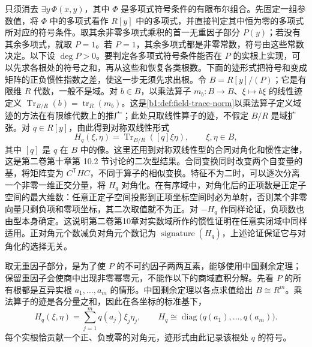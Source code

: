 \begin{proofsketch}
	只须消去 \(\exists y\,\Phi(x,y)\)，其中 \(\Phi\) 是多项式符号条件的有限布尔组合。先固定一组参数值，将 \(\Phi\) 中的多项式看作 \(R[y]\) 中的多项式，并直接判定其中恒为零的多项式所对应的符号条件。取其余非零多项式乘积的首一无重因子部分 \(P(y)\)；若没有其余多项式，就取 \(P=1\)。若 \(P=1\)，其余多项式都是非零常数，符号由这些常数决定。以下设 \(\deg P>0\)。要判定各多项式符号条件能否在 \(P\) 的实根上实现，可以先求各根处的符号之和，再从这些和恢复各类根数。下面的迹形式把符号和变成矩阵的正负惯性指数之差，使这一步无须先求出根。令 \(B=R[y]/(P)\)；它是有限维 \(R\) 代数，一般不是域。对 \(b\in B\)，以乘法算子 \(m_b:B\to B\)、\(\xi\mapsto b\xi\) 的线性迹定义 \(\operatorname{Tr}_{B/R}(b)=\operatorname{tr}_R(m_b)\)。这是\cref{b1:def:field-trace-norm}以乘法算子定义域迹的方法在有限维代数上的推广；此处只取线性算子的迹，不假定 \(B/R\) 是域扩张。对 \(q\in R[y]\)，由此得到对称双线性形式
	\[
		H_q(\xi,\eta)=\operatorname{Tr}_{B/R}([q]\xi\eta),\qquad \xi,\eta\in B,
	\]
	其中 \([q]\) 是 \(q\) 在 \(B\) 中的像。这里还用到对称双线性型的合同对角化和惯性定律，这是第二卷第十章第 10.2 节讨论的二次型结果。合同变换同时改变两个自变量的基，将矩阵变为 \(C^{\mathsf T}HC\)，不同于算子的相似变换。特征不为二时，可以逐次分离一个非零一维正交分量，将 \(H_q\) 对角化。在有序域中，对角化后的正项数是正定子空间的最大维数：任意正定子空间投影到正项坐标空间时必为单射，否则某个非零向量只剩负项和零项坐标，其二次取值就不为正。对 \(-H_q\) 作同样论证，负项数也由型本身确定。这说明第二卷第10章对实数域所作的惯性证明在任意实闭域中同样适用。正对角元个数减负对角元个数记为 \(\operatorname{signature}(H_q)\)，上述论证保证它与对角化的选择无关。

	取无重因子部分，是为了使 \(P\) 的不可约因子两两互素，能够使用中国剩余定理；保留重因子会使商中出现非零幂零元，不能作以下的商域直积分解。先看 \(P\) 的所有根都是互异实根 \(a_1,\ldots,a_m\) 的情形。中国剩余定理以各点求值给出 \(B\cong R^m\)。乘法算子的迹是各分量之和，因此在各坐标的标准基下，
	\[
		H_q(\xi,\eta)=\sum_{j=1}^m q(a_j)\xi_j\eta_j, \qquad H_q\cong\operatorname{diag}\bigl(q(a_1),\ldots,q(a_m)\bigr).
	\]
	每个实根恰贡献一个正、负或零的对角元，迹形式由此记录该根处 \(q\) 的符号。


\end{proofsketch}
